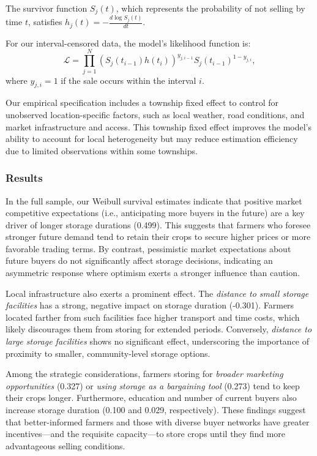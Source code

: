 \documentclass[12pt]{article}
\begin{document}
The survivor function $S_j(t)$, which represents the probability of not selling by time $t$, satisfies $h_j(t) = -\frac{d \log S_j(t)}{dt}. $

For our interval-censored data, the model's likelihood function is:
$$
    \mathcal{L} = \prod_{j=1}^N \left(S_j(t_{i-1}) h(t_i)\right)^{y_{j,i-1}} S_j(t_{i-1})^{1-y_{j,i}},
$$
where $y_{j,i} = 1$ if the sale occurs within the interval $i$.

Our empirical specification includes a township fixed effect to control for unobserved location-specific factors, such as local weather, road conditions, and market infrastructure and access. This township fixed effect improves the model’s ability to account for local heterogeneity but may reduce estimation efficiency due to limited observations within some townships.


\subsubsection{Results}


In the full sample, our Weibull survival estimates indicate that positive market competitive expectations (i.e., anticipating more buyers in the future) are a key driver of longer storage durations (0.499). This suggests that farmers who foresee stronger future demand tend to retain their crops to secure higher prices or more favorable trading terms. By contrast, pessimistic market expectations about future buyers do not significantly affect storage decisions, indicating an asymmetric response where optimism exerts a stronger influence than caution.

Local infrastructure also exerts a prominent effect. The \textit{distance to small storage facilities} has a strong, negative impact on storage duration (-0.301). Farmers located farther from such facilities face higher transport and time costs, which likely discourages them from storing for extended periods. Conversely, \textit{distance to large storage facilities} shows no significant effect, underscoring the importance of proximity to smaller, community-level storage options.

Among the strategic considerations, farmers storing for \textit{broader marketing opportunities} (0.327) or \textit{using storage as a bargaining tool} (0.273) tend to keep their crops longer. Furthermore, education and number of current buyers also increase storage duration (0.100 and 0.029, respectively). These findings suggest that better-informed farmers and those with diverse buyer networks have greater incentives—and the requisite capacity—to store crops until they find more advantageous selling conditions.
\end{document}

